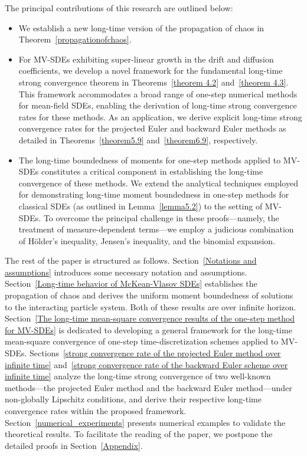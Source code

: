 \documentclass[12pt]{article}
\numberwithin{equation}{section}
\begin{document}
The principal contributions of this research are outlined below:
\begin{itemize}
  \item We establish a new long-time version of the propagation of chaos in Theorem~\ref{propagationofchaos}.
  \item 
  For MV-SDEs exhibiting super-linear growth in the drift and diffusion coefficients, we develop a novel framework for the fundamental long-time strong convergence theorem  in Theorems~\ref{theorem 4.2} and~\ref{theorem 4.3}. This framework accommodates a broad range of one-step numerical methods for mean-field SDEs, enabling the derivation of long-time strong convergence rates for these methods. As an application, we derive explicit long-time strong convergence rates for the projected Euler and backward Euler methods   as detailed in Theorems~\ref{theorem5.9} and~\ref{theorem6.9}, respectively.
  
  \item The long-time boundedness of moments for one-step methods applied to MV-SDEs constitutes a critical component in establishing the long-time convergence of these methods. We extend the analytical techniques employed for demonstrating long-time moment boundedness in one-step methods for classical SDEs (as outlined in Lemma~\ref{lemma5.2}) to the setting of MV-SDEs. To overcome the principal challenge in these proofs—namely, the treatment of measure-dependent terms—we employ a judicious combination of Hölder's inequality, Jensen's inequality, and the binomial expansion.
\end{itemize}

The rest of the paper is structured as follows. Section~\ref{Notations and assumptions} introduces some  necessary notation and assumptions. Section~\ref{Long-time behavior of McKean-Vlasov SDEs} establishes the propagation of chaos   and derives the uniform moment boundedness of solutions to the interacting particle system.  Both of these results are over infinite horizon.    Section~\ref{The long-time mean-square convergence results of the one-step method for MV-SDEs} is dedicated to developing a general framework for the long-time mean-square convergence of one-step time-discretization schemes applied to MV-SDEs. Sections~\ref{strong convergence rate of the projected Euler method over infinite time} and~\ref{strong convergence rate of the backward Euler scheme  over infinite time} analyze the long-time strong convergence of two well-known methods—the projected Euler method and the backward Euler method—under non-globally Lipschitz conditions, and derive their respective long-time convergence rates within the proposed framework. Section~\ref{numerical_experiments} presents numerical examples to validate the theoretical results. To facilitate the reading of the paper, we postpone the  detailed proofs  in Section~\ref{Appendix}.
\end{document}
